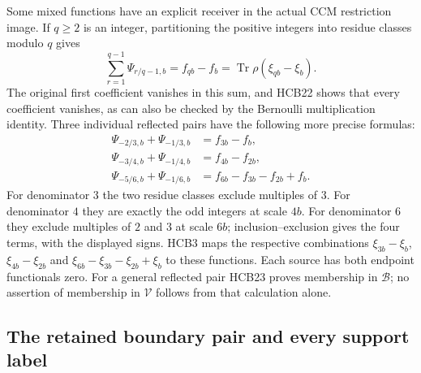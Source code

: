 \documentclass[11pt]{article}
\begin{document}
Some mixed functions have an explicit receiver in the actual CCM
restriction image. If $q\geq2$ is an integer, partitioning the
positive integers into residue classes modulo $q$ gives
\begin{equation}\tag{HCB25}
 \sum_{r=1}^{q-1}\Psi_{r/q-1,b}
      =f_{qb}-f_b=\operatorname{Tr}\rho(\xi_{qb}-\xi_b).
\end{equation}
The original first coefficient vanishes in this sum, and HCB22
shows that every coefficient vanishes, as can also be checked
by the Bernoulli multiplication identity. Three individual
reflected pairs have the following more precise formulas:
\begin{equation}\tag{HCB26}
\begin{split}
 \Psi_{-2/3,b}+\Psi_{-1/3,b}&=f_{3b}-f_b,\\
 \Psi_{-3/4,b}+\Psi_{-1/4,b}&=f_{4b}-f_{2b},\\
 \Psi_{-5/6,b}+\Psi_{-1/6,b}&=f_{6b}-f_{3b}-f_{2b}+f_b.
\end{split}
\end{equation}
For denominator $3$ the two residue classes exclude multiples of
$3$. For denominator $4$ they are exactly the odd integers at
scale $4b$. For denominator $6$ they exclude multiples of $2$
and $3$ at scale $6b$; inclusion--exclusion gives the four terms,
with the displayed signs. HCB3 maps the respective combinations
$\xi_{3b}-\xi_b$, $\xi_{4b}-\xi_{2b}$ and
$\xi_{6b}-\xi_{3b}-\xi_{2b}+\xi_b$ to these functions. Each
source has both endpoint functionals zero. For a general reflected
pair HCB23 proves membership in $\mathcal B$; no assertion of
membership in $\mathcal V$ follows from that calculation alone.

\subsection{The retained boundary pair and every support label}
\end{document}
